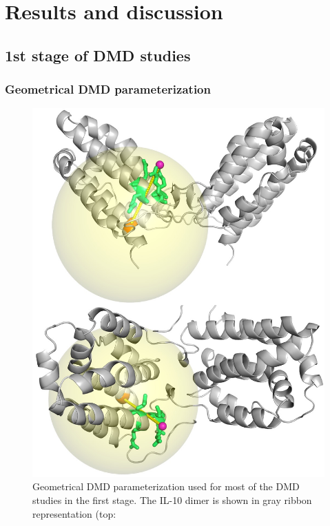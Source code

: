 \section{Results and discussion}

\subsection{1st stage of DMD studies}

\subsubsection{Geometrical DMD parameterization}
\label{dmdil10:method_geom_setup_1st}

\begin{figure}
\centering
\includegraphics[width=1.0\textwidth]{gfx/dmdil10/round1_il10_ligandcenter_proteincore_sphere_top_and_side_001.jpg}
\caption[]{Geometrical DMD parameterization used for most of the DMD studies
in the first stage. The IL-10 dimer is shown in gray ribbon representation (top:
}
\end{figure}
